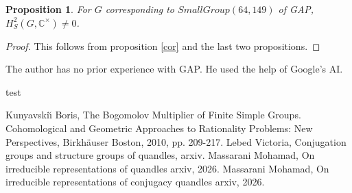\documentclass[12pt, reqno]{amsart}
\newtheorem{proposition}[theorem]{Proposition}
\begin{document}
\begin{proposition}
For $G$ corresponding to $SmallGroup(64,149)$ of GAP, $H^2_S(G,\mathbb{C}^\times)\neq 0$.
\end{proposition}
\begin{proof}
This follows from proposition \ref{cor} and the last two propositions.
\end{proof}
 The author has no prior experience with GAP. He used the help of Google's AI.

\begin{thebibliography}{test}

 



Kunyavski{\u{\i}} Boris, \newblock The Bogomolov Multiplier of Finite Simple Groups. \newblock Cohomological and Geometric Approaches to Rationality Problems: New Perspectives, \newblock Birkh{\"a}user Boston, 2010, pp. 209-217.
Lebed Victoria, Conjugation groups and structure groups of quandles, arxiv.
Massarani Mohamad, \newblock On irreducible representations of quandles \newblock arxiv, 2026.
Massarani Mohamad, \newblock On irreducible representations of conjugacy quandles \newblock arxiv, 2026.
 
 



\end{thebibliography}


 


 
\end{document}
